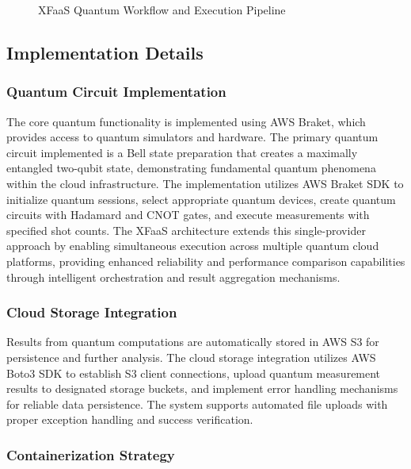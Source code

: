 \documentclass[onecolumn]{IEEEtran}
\begin{document}
\begin{figure}[ht]
{
}
\caption{XFaaS Quantum Workflow and Execution Pipeline}
\label{fig:xfaas_workflow}
\end{figure}


\subsection{Implementation Details}

\subsubsection{Quantum Circuit Implementation}

The core quantum functionality is implemented using AWS Braket, which provides access to quantum simulators and hardware. The primary quantum circuit implemented is a Bell state preparation that creates a maximally entangled two-qubit state, demonstrating fundamental quantum phenomena within the cloud infrastructure. The implementation utilizes AWS Braket SDK to initialize quantum sessions, select appropriate quantum devices, create quantum circuits with Hadamard and CNOT gates, and execute measurements with specified shot counts. The XFaaS architecture extends this single-provider approach by enabling simultaneous execution across multiple quantum cloud platforms, providing enhanced reliability and performance comparison capabilities through intelligent orchestration and result aggregation mechanisms.

\subsubsection{Cloud Storage Integration}

Results from quantum computations are automatically stored in AWS S3 for persistence and further analysis. The cloud storage integration utilizes AWS Boto3 SDK to establish S3 client connections, upload quantum measurement results to designated storage buckets, and implement error handling mechanisms for reliable data persistence. The system supports automated file uploads with proper exception handling and success verification.

\subsubsection{Containerization Strategy}
\end{document}
